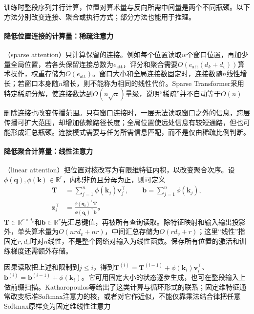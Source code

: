 训练时整段序列并行计算，位置对算术量与反向所需中间量是两个不同瓶颈。以下方法分别改变连接、聚合或执行方式；部分方法也能用于推理。

\paragraph{降低位置连接的计算量：稀疏注意力}

（sparse attention）只计算保留的连接。例如每个位置读取$w$个窗口位置，再加少量全局位置，若各头保留连接总数为$e_{\mathrm{att}}$，评分和聚合需要$O(e_{\mathrm{att}}(d_k+d_v))$算术操作，权重存储为$O(e_{\mathrm{att}})$。窗口大小和全局连接数固定时，连接数随$n$线性增长；若窗口本身随$n$增长，则不能称为相同的线性代价。Sparse Transformer采用特定稀疏分解，使连接数达到$O(n\sqrt n)$量级，说明“稀疏”并不自动等于$O(n)$

删除连接也改变传播范围。只有窗口连接时，一层无法读取窗口之外的信息，跨层传播可扩大范围，却增加依赖路径长度；全局位置使远处信息有较短通路，但也可能形成汇总瓶颈。连接模式需要与任务所需信息匹配，而不是仅由稀疏比例判断。

\paragraph{降低聚合计算量：线性注意力}

（linear attention）把位置对核改写为有限维特征内积，以改变聚合次序。设$\phi(\bm q),\phi(\bm k)\in\mathbb R^r$，内积非负且分母为正，则可定义
\begin{equation}
  \begin{aligned}
    \bm T&=\sum_{j=1}^n\phi(\bm k_j)\bm v_j^{\top},\qquad
    \bm b=\sum_{j=1}^n\phi(\bm k_j),\\
    \bm z_i^{\top}&=\frac{\phi(\bm q_i)^{\top}\bm T}
                           {\phi(\bm q_i)^{\top}\bm b}\text{。}
  \end{aligned}
  \label{eq:transformer-linear-attention}
\end{equation}
$\bm T\in\mathbb R^{r\times d_v}$和$\bm b\in\mathbb R^r$先汇总键值，再被所有查询读取。除特征映射和输入输出投影外，单头算术量为$O(nrd_v+nr)$，中间汇总存储为$O(rd_v+r)$；这里“线性”指固定$r,d_v$时对$n$线性，不是整个网络对输入为线性函数。保存所有位置的激活和训练梯度还需额外存储。

因果读取把上述和限制到$j\leq i$，得到$\bm T^{(i)}=\bm T^{(i-1)}+\phi(\bm k_i)\bm v_i^{\top}$、$\bm b^{(i)}=\bm b^{(i-1)}+\phi(\bm k_i)$。它可用固定大小的状态逐步生成，也可在整段输入上做前缀扫描。Katharopoulos等给出了这类计算与循环形式的联系；固定维特征通常改变标准Softmax注意力的核，或者对它作近似，不能仅靠乘法结合律把任意Softmax原样变为固定维线性注意力

